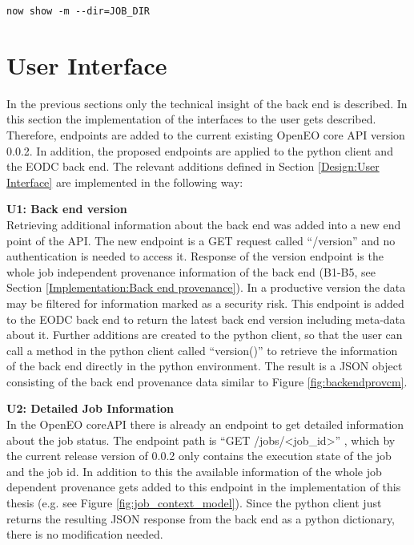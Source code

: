 \documentclass[draft,final]{vutinfth} %
\begin{document}
\begin{lstlisting}[frame=single]
now show -m --dir=JOB_DIR
\end{lstlisting}

\section{User Interface}\label{Implementation:User Interface}
In the previous sections only the technical insight of the back end is described. In this section the implementation of the interfaces to the user gets described. Therefore, endpoints are added to the current existing OpenEO core API version 0.0.2. In addition, the proposed endpoints are applied to the python client and the EODC back end. The relevant additions defined in Section \ref{Design:User Interface} are implemented in the following way:

\textbf{U1: Back end version} \\
Retrieving additional information about the back end was added into a new end point of the API. The new endpoint is a GET request called “/version” and no authentication is needed to access it. Response of the version endpoint is the whole job independent provenance information of the back end (B1-B5, see Section \ref{Implementation:Back end provenance}). In a productive version the data may be filtered for information marked as a security risk. This endpoint is added to the EODC back end to return the latest back end version including meta-data about it. Further additions are created to the python client, so that the user can call a method in the python client called “version()” to retrieve the information of the back end directly in the python environment. The result is a JSON object consisting of the back end provenance data similar to Figure \ref{fig:backendprovcm}.

\textbf{U2: Detailed Job Information} \\
In the OpenEO coreAPI there is already an endpoint to get detailed information about the job status. The endpoint path is “GET /jobs/<job\_id>” , which by the current release version of 0.0.2 only contains the execution state of the job and the job id. In addition to this the available information of the whole job dependent provenance gets added to this endpoint in the implementation of this thesis (e.g. see Figure \ref{fig:job_context_model}). Since the python client just returns the resulting JSON response from the back end as a python dictionary, there is no modification needed.
\end{document}
